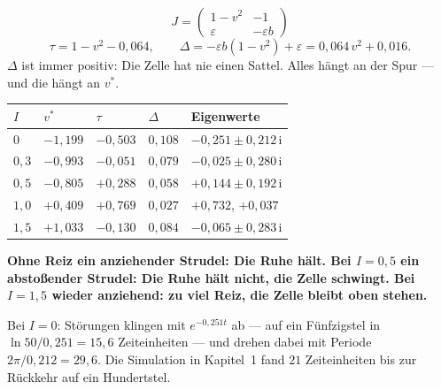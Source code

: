 \begin{merksatz}
\[ J = \begin{pmatrix} 1 - v^{2} & -1 \\ \varepsilon & -\varepsilon b \end{pmatrix} \]
\[ \tau = 1 - v^{2} - 0{,}064, \qquad \Delta = -\varepsilon b(1-v^{2}) + \varepsilon = 0{,}064\,v^{2} + 0{,}016 . \]
$\Delta$ ist immer positiv: Die Zelle hat nie einen Sattel. Alles hängt an der Spur --- und die hängt an $v^{*}$.

\begin{center}
{\small
\renewcommand{\arraystretch}{1.48}
\begin{tabular}{@{}P{1.0cm}P{1.6cm}P{1.6cm}P{1.6cm}P{3.0cm}@{}}
\toprule
$I$ & $v^{*}$ & $\tau$ & $\Delta$ & \textbf{Eigenwerte}\\
\midrule
$0$ & $-1{,}199$ & $-0{,}503$ & $0{,}108$ & $-0{,}251 \pm 0{,}212\,\mathrm i$\\
$0{,}3$ & $-0{,}993$ & $-0{,}051$ & $0{,}079$ & $-0{,}025 \pm 0{,}280\,\mathrm i$\\
$0{,}5$ & $-0{,}805$ & $+0{,}288$ & $0{,}058$ & $+0{,}144 \pm 0{,}192\,\mathrm i$\\
$1{,}0$ & $+0{,}409$ & $+0{,}769$ & $0{,}027$ & $+0{,}732$, $+0{,}037$\\
$1{,}5$ & $+1{,}033$ & $-0{,}130$ & $0{,}084$ & $-0{,}065 \pm 0{,}283\,\mathrm i$\\
\bottomrule
\end{tabular}}
\end{center}

\begin{center}
\begin{minipage}{0.9\textwidth}
\textbf{Ohne Reiz ein anziehender Strudel: Die Ruhe hält. Bei $I = 0{,}5$ ein abstoßender Strudel: Die Ruhe hält nicht, die Zelle schwingt. Bei $I = 1{,}5$ wieder anziehend: zu viel Reiz, die Zelle bleibt oben stehen.}
\end{minipage}
\end{center}

Bei $I = 0$: Störungen klingen mit $e^{-0{,}251 t}$ ab --- auf ein Fünfzigstel in $\ln 50/0{,}251 = 15{,}6$ Zeiteinheiten --- und drehen dabei mit Periode $2\pi/0{,}212 = 29{,}6$. Die Simulation in Kapitel~1 fand $21$ Zeiteinheiten bis zur Rückkehr auf ein Hundertstel. \checkmark


\end{merksatz}
